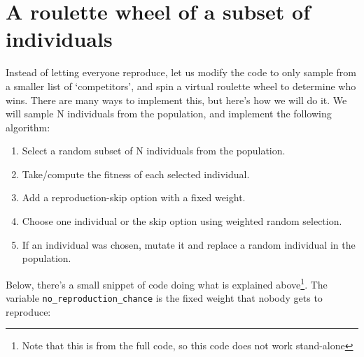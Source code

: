\documentclass[
  letterpaper,
  DIV=11,
  numbers=noendperiod]{scrreprt}
\providecommand{\tightlist}{%
  \setlength{\itemsep}{0pt}\setlength{\parskip}{0pt}}\usepackage{longtable,booktabs,array}
\theoremstyle{definition}
\theoremstyle{remark}
\begin{document}
\section{A roulette wheel of a subset of
individuals}\label{a-roulette-wheel-of-a-subset-of-individuals}

Instead of letting everyone reproduce, let us modify the code to only
sample from a smaller list of `competitors', and spin a virtual roulette
wheel to determine who wins. There are many ways to implement this, but
here's how we will do it. We will sample N individuals from the
population, and implement the following algorithm:

\begin{enumerate}
\def\labelenumi{\arabic{enumi}.}
\tightlist
\item
  Select a random subset of N individuals from the population.
\item
  Take/compute the fitness of each selected individual.
\item
  Add a reproduction-skip option with a fixed weight.
\item
  Choose one individual or the skip option using weighted random
  selection.
\item
  If an individual was chosen, mutate it and replace a random individual
  in the population.
\end{enumerate}

Below, there's a small snippet of code doing what is explained
above\footnote{Note that this is from the full code, so this code does
  not work stand-alone}. The variable \texttt{no\_reproduction\_chance}
is the fixed weight that nobody gets to reproduce:
\end{document}

